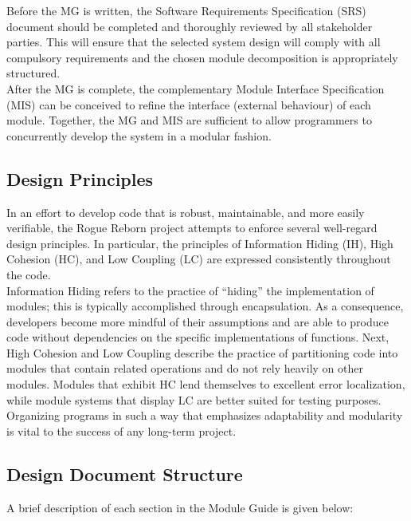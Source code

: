 \documentclass[12pt, titlepage]{article}
\begin{document}
        Before the MG is written, the Software Requirements Specification (SRS) document should be completed and thoroughly reviewed by all stakeholder parties.  This will ensure that the selected system design will comply with all compulsory requirements and the chosen module decomposition is appropriately structured.\\

        After the MG is complete, the complementary Module Interface Specification (MIS) can be conceived to refine the interface (external behaviour) of each module.  Together, the MG and MIS are sufficient to allow programmers to concurrently develop the system in a modular fashion.
    
    \subsection{Design Principles}
        In an effort to develop code that is robust, maintainable, and more easily verifiable, the Rogue Reborn project attempts to enforce several well-regard design principles.  In particular, the principles of Information Hiding (IH), High Cohesion (HC), and Low Coupling (LC) are expressed consistently throughout the code. \\

        Information Hiding refers to the practice of ``hiding'' the implementation of modules; this is typically accomplished through encapsulation.  As a consequence, developers become more mindful of their assumptions and are able to produce code without dependencies on the specific implementations of functions.  Next, High Cohesion and Low Coupling describe the practice of partitioning code into modules that contain related operations and do not rely heavily on other modules.  Modules that exhibit HC lend themselves to excellent error localization, while module systems that display LC are better suited for testing purposes.  Organizing programs in such a way that emphasizes adaptability and modularity is vital to the success of any long-term project.

    \subsection{Design Document Structure}
        A brief description of each section in the Module Guide is given below:
\end{document}
